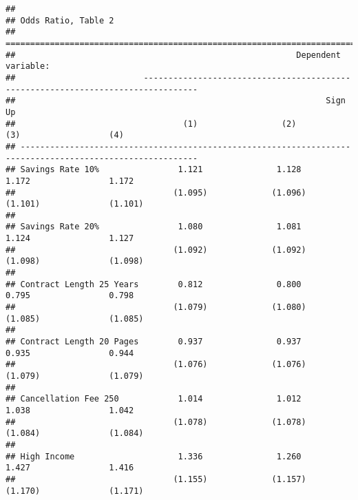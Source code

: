 \documentclass[
]{article}
\begin{document}
\begin{verbatim}
## 
## Odds Ratio, Table 2
## ==========================================================================================================
##                                                         Dependent variable:                               
##                          ---------------------------------------------------------------------------------
##                                                               Sign Up                                     
##                                  (1)                 (2)                 (3)                  (4)         
## ----------------------------------------------------------------------------------------------------------
## Savings Rate 10%                1.121               1.128               1.172                1.172        
##                                (1.095)             (1.096)             (1.101)              (1.101)       
##                                                                                                           
## Savings Rate 20%                1.080               1.081               1.124                1.127        
##                                (1.092)             (1.092)             (1.098)              (1.098)       
##                                                                                                           
## Contract Length 25 Years        0.812               0.800               0.795                0.798        
##                                (1.079)             (1.080)             (1.085)              (1.085)       
##                                                                                                           
## Contract Length 20 Pages        0.937               0.937               0.935                0.944        
##                                (1.076)             (1.076)             (1.079)              (1.079)       
##                                                                                                           
## Cancellation Fee 250            1.014               1.012               1.038                1.042        
##                                (1.078)             (1.078)             (1.084)              (1.084)       
##                                                                                                           
## High Income                     1.336               1.260               1.427                1.416        
##                                (1.155)             (1.157)             (1.170)              (1.171)       

\end{verbatim}
\end{document}
